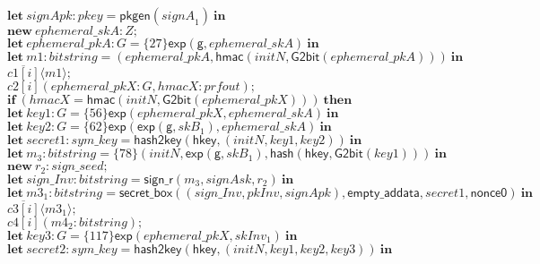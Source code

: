 \documentclass{article}
\newcommand{\cinput}[2]{{#1}({#2})}
\newcommand{\coutput}[2]{\overline{#1}\langle{#2}\rangle}
\newcommand{\kw}[1]{\mathbf{#1}}
\newcommand{\kwf}[1]{\mathsf{#1}}
\newcommand{\var}[1]{\mathit{#1}}
\newcommand{\kwt}[1]{\mathit{#1}}
\newcommand{\kwc}[1]{\mathit{#1}}
\begin{document}
\begin{tabbing}
\>$\quad \kw{let}\ \var{signApk}: \kwt{pkey} = \kwf{pkgen}(\var{signA}_{1})\ \kw{in}$\\
\>$\quad \kw{new}\ \var{ephemeral{\_}skA}: \kwt{Z};$\\
\>$\quad \kw{let}\ \var{ephemeral{\_}pkA}: \kwt{G} = \{27\}\kwf{exp}(\kwf{g}, \var{ephemeral{\_}skA})\ \kw{in}$\\
\>$\quad \kw{let}\ \var{m1}: \kwt{bitstring} = \kwf{}(\var{ephemeral{\_}pkA}, \kwf{hmac}(\var{initN}, \kwf{G2bit}(\var{ephemeral{\_}pkA})))\ \kw{in}$\\
\>$\quad \coutput{\kwc{c1}[\var{i}]}{\var{m1}};$\\
\>$\quad \cinput{\kwc{c2}[\var{i}]}{\var{ephemeral{\_}pkX}: \kwt{G}, \var{hmacX}: \kwt{prfout}};$\\
\>$\quad \kw{if}\ (\var{hmacX}  =  \kwf{hmac}(\var{initN}, \kwf{G2bit}(\var{ephemeral{\_}pkX})))\ \kw{then}$\\
\>$\quad \kw{let}\ \var{key1}: \kwt{G} = \{56\}\kwf{exp}(\var{ephemeral{\_}pkX}, \var{ephemeral{\_}skA})\ \kw{in}$\\
\>$\quad \kw{let}\ \var{key2}: \kwt{G} = \{62\}\kwf{exp}(\kwf{exp}(\kwf{g}, \var{skB}_{1}), \var{ephemeral{\_}skA})\ \kw{in}$\\
\>$\quad \kw{let}\ \var{secret1}: \kwt{sym{\_}key} = \kwf{hash2key}(\kwf{hkey}, \kwf{}(\var{initN}, \var{key1}, \var{key2}))\ \kw{in}$\\
\>$\quad \kw{let}\ \var{m}_{3}: \kwt{bitstring} = \{78\}\kwf{}(\var{initN}, \kwf{exp}(\kwf{g}, \var{skB}_{1}), \kwf{hash}(\kwf{hkey}, \kwf{G2bit}(\var{key1})))\ \kw{in}$\\
\>$\quad \kw{new}\ \var{r}_{2}: \kwt{sign{\_}seed};$\\
\>$\quad \kw{let}\ \var{sign{\_}Inv}: \kwt{bitstring} = \kwf{sign{\_}r}(\var{m}_{3}, \var{signAsk}, \var{r}_{2})\ \kw{in}$\\
\>$\quad \kw{let}\ \var{m3}_{1}: \kwt{bitstring} = \kwf{secret{\_}box}(\kwf{}(\var{sign{\_}Inv}, \var{pkInv}, \var{signApk}), \kwf{empty{\_}addata}, \var{secret1}, \kwf{nonce0})\ \kw{in}$\\
\>$\quad \coutput{\kwc{c3}[\var{i}]}{\var{m3}_{1}};$\\
\>$\quad \cinput{\kwc{c4}[\var{i}]}{\var{m4}_{2}: \kwt{bitstring}};$\\
\>$\quad \kw{let}\ \var{key3}: \kwt{G} = \{117\}\kwf{exp}(\var{ephemeral{\_}pkX}, \var{skInv}_{1})\ \kw{in}$\\
\>$\quad \kw{let}\ \var{secret2}: \kwt{sym{\_}key} = \kwf{hash2key}(\kwf{hkey}, \kwf{}(\var{initN}, \var{key1}, \var{key2}, \var{key3}))\ \kw{in}$\\

\end{tabbing}
\end{document}
